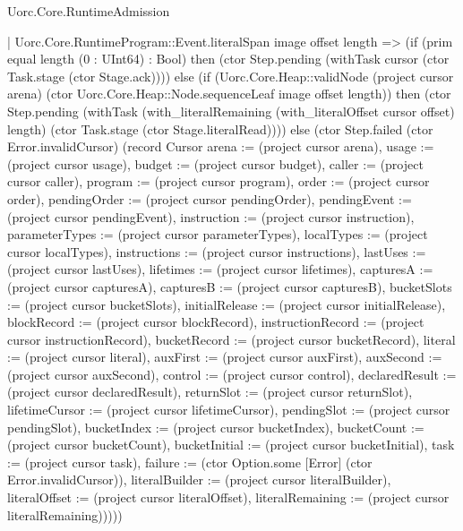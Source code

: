 \begin{lexlean}{Uorc.Core.RuntimeAdmission}
\begin{semanticmodule}
{          | Uorc.Core.RuntimeProgram::Event.literalSpan image offset length => (if (prim equal length (0 : UInt64) : Bool) then (ctor Step.pending (withTask cursor (ctor Task.stage (ctor Stage.ack)))) else (if (Uorc.Core.Heap::validNode (project cursor arena) (ctor Uorc.Core.Heap::Node.sequenceLeaf image offset length)) then (ctor Step.pending (withTask (with_literalRemaining (with_literalOffset cursor offset) length) (ctor Task.stage (ctor Stage.literalRead)))) else (ctor Step.failed (ctor Error.invalidCursor) (record Cursor {arena := (project cursor arena), usage := (project cursor usage), budget := (project cursor budget), caller := (project cursor caller), program := (project cursor program), order := (project cursor order), pendingOrder := (project cursor pendingOrder), pendingEvent := (project cursor pendingEvent), instruction := (project cursor instruction), parameterTypes := (project cursor parameterTypes), localTypes := (project cursor localTypes), instructions := (project cursor instructions), lastUses := (project cursor lastUses), lifetimes := (project cursor lifetimes), capturesA := (project cursor capturesA), capturesB := (project cursor capturesB), bucketSlots := (project cursor bucketSlots), initialRelease := (project cursor initialRelease), blockRecord := (project cursor blockRecord), instructionRecord := (project cursor instructionRecord), bucketRecord := (project cursor bucketRecord), literal := (project cursor literal), auxFirst := (project cursor auxFirst), auxSecond := (project cursor auxSecond), control := (project cursor control), declaredResult := (project cursor declaredResult), returnSlot := (project cursor returnSlot), lifetimeCursor := (project cursor lifetimeCursor), pendingSlot := (project cursor pendingSlot), bucketIndex := (project cursor bucketIndex), bucketCount := (project cursor bucketCount), bucketInitial := (project cursor bucketInitial), task := (project cursor task), failure := (ctor Option.some [Error] (ctor Error.invalidCursor)), literalBuilder := (project cursor literalBuilder), literalOffset := (project cursor literalOffset), literalRemaining := (project cursor literalRemaining)}))))
}
\end{semanticmodule}
\end{lexlean}
